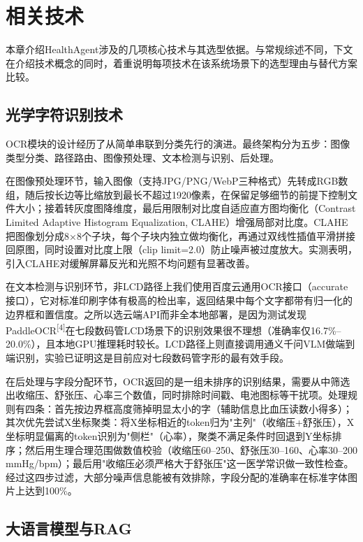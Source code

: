 \documentclass[zihao=-4,a4paper]{ctexart}
\numberwithin{figure}{section}
\numberwithin{table}{section}
\begin{document}
\section{相关技术}

本章介绍HealthAgent涉及的几项核心技术与其选型依据。与常规综述不同，下文在介绍技术概念的同时，着重说明每项技术在该系统场景下的选型理由与替代方案比较。

\subsection{光学字符识别技术}

OCR模块的设计经历了从简单串联到分类先行的演进。最终架构分为五步：图像类型分类、路径路由、图像预处理、文本检测与识别、后处理。

在图像预处理环节，输入图像（支持JPG/PNG/WebP三种格式）先转成RGB数组，随后按长边等比缩放到最长不超过1920像素，在保留足够细节的前提下控制文件大小；接着转灰度图降维度，最后用限制对比度自适应直方图均衡化（Contrast Limited Adaptive Histogram Equalization, CLAHE）增强局部对比度。CLAHE把图像划分成8×8个子块，每个子块内独立做均衡化，再通过双线性插值平滑拼接回原图，同时设置对比度上限（clip limit=2.0）防止噪声被过度放大。实测表明，引入CLAHE对缓解屏幕反光和光照不均问题有显著改善。

在文本检测与识别环节，非LCD路径上我们使用百度云通用OCR接口（accurate接口），它对标准印刷字体有极高的检出率，返回结果中每个文字都带有归一化的边界框和置信度。之所以选云端API而非全本地部署，是因为测试发现PaddleOCR\textsuperscript{[4]}在七段数码管LCD场景下的识别效果很不理想（准确率仅16.7\%--20.0\%），且本地GPU推理耗时较长。LCD路径上则直接调用通义千问VLM做端到端识别，实验已证明这是目前应对七段数码管字形的最有效手段。

在后处理与字段分配环节，OCR返回的是一组未排序的识别结果，需要从中筛选出收缩压、舒张压、心率三个数值，同时排除时间戳、电池图标等干扰项。处理规则有四条：首先按边界框高度筛掉明显太小的字（辅助信息比血压读数小得多）；其次优先尝试X坐标聚类：将X坐标相近的token归为"主列"（收缩压+舒张压），X坐标明显偏离的token识别为"侧栏"（心率），聚类不满足条件时回退到Y坐标排序；然后用生理合理范围做数值校验（收缩压60--250、舒张压30--160、心率30--200 mmHg/bpm）；最后用"收缩压必须严格大于舒张压"这一医学常识做一致性检查。经过这四步过滤，大部分噪声信息能被有效排除，字段分配的准确率在标准字体图片上达到100\%。

\subsection{大语言模型与RAG}
\end{document}
